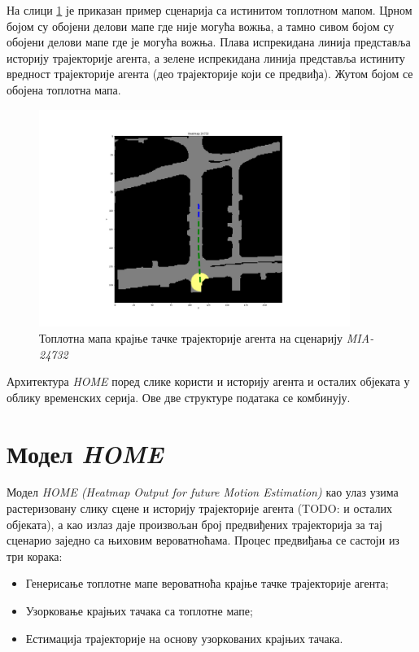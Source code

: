 \documentclass[11pt,oneside]{memoir}
\begin{document}
На слици \ref{heatmap-MIA-24732} је приказан пример сценарија са истинитом топлотном мапом. Црном бојом су обојени делови мапе
где није могућа вожња, а тамно сивом бојом су обојени делови мапе где је могућа вожња. Плава испрекидана линија представља историју
трајекторије агента, а зелене испрекидана линија представља истиниту вредност трајекторије агента (део трајекторије који се предвиђа). Жутом бојом
се обојена топлотна мапа.

\begin{figure}[H]
  \centering
  \includegraphics[width=0.9\textwidth]{images/heatmap_MIA_24732.png}
  \caption{Топлотна мапа крајње тачке трајекторије агента на сценарију \textit{MIA-24732} \label{heatmap-MIA-24732}}
\end{figure}

Архитектура \textit{HOME} поред слике користи и историју агента и осталих објеката у облику временских серија. Ове две структуре података
се комбинују.

\section{Модел \textit{HOME}}

Модел \textit{HOME (Heatmap Output for future Motion Estimation)} \cite{home} као улаз узима растеризовану слику сцене и историју трајекторије агента
(TODO: и осталих објеката), а као излаз даје произвољан број предвиђених трајекторија за тај сценарио заједно са њиховим вероватноћама. 
Процес предвиђања се састоји из три корака:
\begin{itemize}
  \item Генерисање топлотне мапе вероватноћа крајње тачке трајекторије агента;
  \item Узорковање крајњих тачака са топлотне мапе;
  \item Естимација трајекторије на основу узоркованих крајњих тачака.
\end{itemize}
\end{document}
